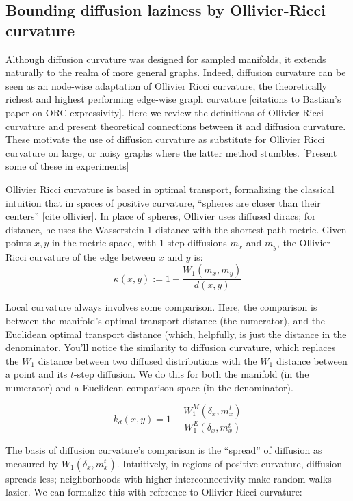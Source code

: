 \documentclass[
  letterpaper,
  DIV=11,
  numbers=noendperiod]{scrartcl}
\theoremstyle{plain}
\theoremstyle{plain}
\theoremstyle{definition}
\theoremstyle{definition}
\theoremstyle{remark}
\begin{document}
\subsection{Bounding diffusion laziness by Ollivier-Ricci
curvature}\label{bounding-diffusion-laziness-by-ollivier-ricci-curvature}

Although diffusion curvature was designed for sampled manifolds, it
extends naturally to the realm of more general graphs. Indeed, diffusion
curvature can be seen as an node-wise adaptation of Ollivier Ricci
curvature, the theoretically richest and highest performing edge-wise
graph curvature {[}citations to Bastian's paper on ORC expressivity{]}.
Here we review the definitions of Ollivier-Ricci curvature and present
theoretical connections between it and diffusion curvature. These
motivate the use of diffusion curvature as substitute for Ollivier Ricci
curvature on large, or noisy graphs where the latter method stumbles.
{[}Present some of these in experiments{]}

Ollivier Ricci curvature is based in optimal transport, formalizing the
classical intuition that in spaces of positive curvature, ``spheres are
closer than their centers'' {[}cite ollivier{]}. In place of spheres,
Ollivier uses diffused diracs; for distance, he uses the Wasserstein-1
distance with the shortest-path metric. Given points \(x,y\) in the
metric space, with 1-step diffusions \(m_{x}\) and \(m_{y}\), the
Ollivier Ricci curvature of the edge between \(x\) and \(y\) is:
\[\kappa(x, y):=1-\frac{W_1\left(m_x, m_y\right)}{d(x, y)}\]

Local curvature always involves some comparison. Here, the comparison is
between the manifold's optimal transport distance (the numerator), and
the Euclidean optimal transport distance (which, helpfully, is just the
distance in the denominator. You'll notice the similarity to diffusion
curvature, which replaces the \(W_{1}\) distance between two diffused
distributions with the \(W_{1}\) distance between a point and its
\(t\)-step diffusion. We do this for both the manifold (in the
numerator) and a Euclidean comparison space (in the denominator).

\[
k_{d}(x,y) = 1 - \frac{W_{1}^M(\delta_{x}, m_{x}^t)}{W_{1}^E(\delta_{x},m_{x}^t)}
\]

The basis of diffusion curvature's comparison is the ``spread'' of
diffusion as measured by \(W_{1}(\delta_{x},m_{x}^t)\). Intuitively, in
regions of positive curvature, diffusion spreads less; neighborhoods
with higher interconnectivity make random walks lazier. We can formalize
this with reference to Ollivier Ricci curvature:
\end{document}
